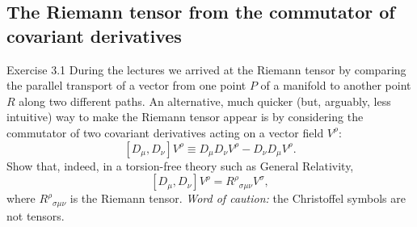 \documentclass[11pt,a4paper]{article}
\numberwithin{equation}{subsection}
\begin{document}
\subsection{The Riemann tensor from the commutator of covariant derivatives}
\begin{problem}{Exercise 3.1}
During the lectures we arrived at the Riemann tensor by comparing the parallel transport of a vector from one point $P$ of a manifold to another point $R$ along two different paths. An alternative, much quicker (but, arguably, less intuitive) way to make the Riemann tensor appear is by considering the commutator of two covariant derivatives acting on a vector field $V^\rho$:
\[
  [D_\mu,D_\nu]V^\rho\equiv D_\mu D_\nu V^\rho-D_\nu D_\mu V^\rho .
\]
Show that, indeed, in a torsion-free theory such as General Relativity,
\[
  [D_\mu,D_\nu]V^\rho=R^\rho{}_{\sigma\mu\nu}V^\sigma ,
\]
where $R^\rho{}_{\sigma\mu\nu}$ is the Riemann tensor. \emph{Word of caution:} the Christoffel symbols are not tensors.
\end{problem}
\end{document}
